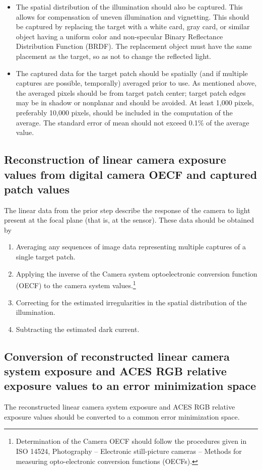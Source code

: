 \begin{itemize}
	\item The spatial distribution of the illumination should also be captured. This allows for compensation of uneven illumination and vignetting. This should be captured by replacing the target with a white card, gray card, or similar object having a uniform color and non-specular Binary Reflectance Distribution Function (BRDF). The replacement object must have the same placement as the target, so as not to change the reflected light.
	\item The captured data for the target patch should be spatially (and if multiple captures are possible, temporally) averaged prior to use. As mentioned above, the averaged pixels should be from target patch center; target patch edges may be in shadow or nonplanar and should be avoided. At least 1,000 pixels, preferably 10,000 pixels, should be included in the computation of the average. The standard error of mean should not exceed 0.1\% of the average value.	
\end{itemize}

\subsection*{Reconstruction of linear camera exposure values from digital camera OECF and captured patch values}
The linear data from the prior step describe the response of the camera to light present at the focal plane (that is, at the sensor). These data should be obtained by 

\begin{enumerate}
	\item Averaging any sequences of image data representing multiple captures of a single target patch.
	\item Applying the inverse of the Camera system optoelectronic conversion function (OECF) to the camera system values.\footnote{Determination of the Camera OECF should follow the procedures given in ISO 14524, Photography -- Electronic still-picture cameras -- Methods for measuring opto-electronic conversion functions (OECFs).} 
	\item Correcting for the estimated irregularities in the spatial distribution of the illumination.
	\item Subtracting the estimated dark current.
\end{enumerate}

\subsection*{Conversion of reconstructed linear camera system exposure and ACES RGB relative exposure values to an error minimization space}
The reconstructed linear camera system exposure and ACES RGB relative exposure values should be converted to a common error minimization space. 

